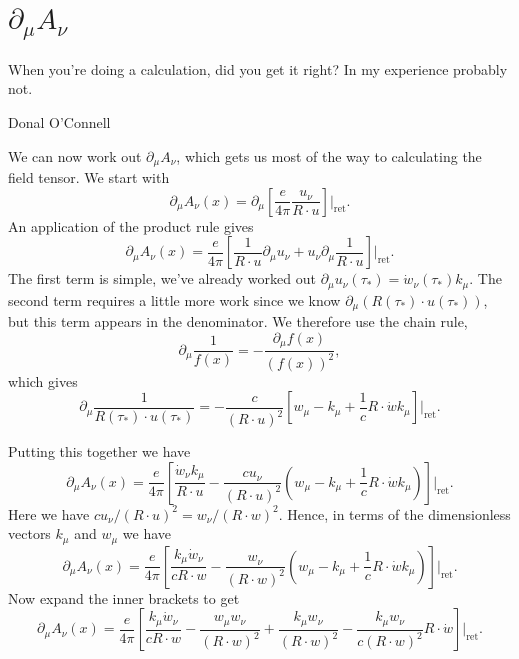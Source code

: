 \documentclass[fleqn]{NotesClass}
\newcommand*{\ret}{{\text{ret}}}
\begin{document}
    \section{\texorpdfstring{\(\partial_\mu A_\nu\)}{Derivative of Potential}}
    \epigraph{When you're doing a calculation, did you get it right? In my experience probably not.}{Donal O'Connell}
    We can now work out \(\partial_\mu A_\nu\), which gets us most of the way to calculating the field tensor.
    We start with
    \begin{equation}
        \partial_\mu A_\nu(x) = \partial_\mu \left[ \frac{e}{4\pi} \frac{u_\nu}{R \cdot u} \right] \bigg|_{\ret}.
    \end{equation}
    An application of the product rule gives
    \begin{equation}
        \partial_\mu A_\nu(x) = \frac{e}{4\pi}\left[ \frac{1}{R \cdot u} \partial_\mu u_\nu + u_\nu \partial_\mu \frac{1}{R \cdot u} \right] \bigg|_{\ret}.
    \end{equation}
    The first term is simple, we've already worked out \(\partial_\mu u_\nu(\tau_*) = \dot{w}_\nu(\tau_*)k_\mu\).
    The second term requires a little more work since we know \(\partial_\mu(R(\tau_*) \cdot u(\tau_*))\), but this term appears in the denominator.
    We therefore use the chain rule,
    \begin{equation}
        \partial_\mu \frac{1}{f(x)} = -\frac{\partial_\mu f(x)}{(f(x))^2},
    \end{equation}
    which gives
    \begin{equation}
        \partial_\mu \frac{1}{R(\tau_*) \cdot u(\tau_*)} = - \frac{c}{(R \cdot u)^2}\left[ w_\mu - k_\mu + \frac{1}{c} R \cdot \dot{w} k_\mu \right] \bigg|_{\ret}.
    \end{equation}
    
    Putting this together we have
    \begin{equation}
        \partial_\mu A_\nu(x) = \frac{e}{4\pi} \left[ \frac{\dot{w}_\nu k_\mu}{R \cdot u} - \frac{cu_\nu}{(R \cdot u)^2} \left( w_\mu - k_\mu + \frac{1}{c} R \cdot \dot{w} k_\mu \right) \right] \bigg|_{\ret}.
    \end{equation}
    Here we have \(cu_\nu/(R\cdot u)^2 = w_\nu/(R\cdot w)^2\).
    Hence, in terms of the dimensionless vectors \(k_\mu\) and \(w_\mu\) we have
    \begin{equation}
        \partial_\mu A_\nu(x) = \frac{e}{4\pi} \left[ \frac{k_\mu \dot{w}_\nu}{cR \cdot w} - \frac{w_\nu}{(R \cdot w)^2}\left( w_\mu - k_\mu + \frac{1}{c}R \cdot \dot{w}k_\mu\right) \right] \bigg|_{\ret}.
    \end{equation}
    Now expand the inner brackets to get
    \begin{equation}
        \partial_\mu A_\nu(x) = \frac{e}{4\pi} \left[ \frac{k_\mu \dot{w}_\nu}{cR\cdot w} - \frac{w_\mu w_\nu}{(R\cdot w)^2} + \frac{k_\mu w_\nu}{(R\cdot w)^2} - \frac{k_\mu w_\nu}{c(R\cdot w)^2} R\cdot \dot{w} \right] \bigg|_{\ret}.
    \end{equation}
    
\end{document}
